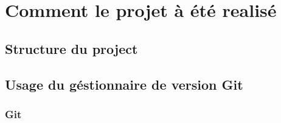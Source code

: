 \appendix
\chapter{Comment le projet à été realisé}
\section{Structure du project}
\section{Usage du géstionnaire de version Git}
\subsection{Git}

